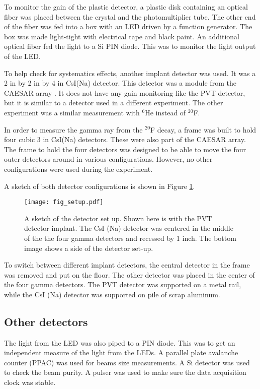 To monitor the gain of the plastic detector, a plastic disk containing an optical fiber was placed between the crystal and the photomultiplier tube. 
The other end of the fiber was fed into a box with an LED driven by a function generator. 
The box was made light-tight with electrical tape and black paint.
An additional optical fiber fed the light to a Si PIN diode.
This was to monitor the light output of the LED.

To help check for systematics effects, another implant detector was used.
It was a 2 in by 2 in by 4 in  CsI(Na) detector. 
This detector was a module from the CAESAR array \cite{Wei10}.
It does not have any gain monitoring like the PVT detector, but it is similar to a detector used in a different experiment. 
The other experiment was a similar measurement with $^{6}$He instead of $^{20}$F.

In order to measure the gamma ray from the $^{20}$F decay, a frame was built to hold four cubic 3 in CsI(Na) detectors.  
These were also part of the CAESAR array.
The frame to hold the four detectors was designed to be able to move the four outer detectors around in various configurations.
However, no other configurations were used during the experiment. 

A sketch of both detector configurations is shown in Figure \ref{fig:detsketch}.

\begin{figure}
	\texttt{[image: fig\_setup.pdf]}
	\caption{A sketch of the detector set up. 
	Shown here is with the PVT detector implant.
	The CsI (Na) detector was centered in the middle of the the four gamma detectors and recessed by 1 inch.
	The bottom image shows a side of the detector set-up.}
	\label{fig:detsketch}
\end{figure}

To switch between different implant detectors, the central detector in the frame was removed and put on the floor.
The other detector was placed in the center of the four gamma detectors.
The PVT detector was supported on a metal rail, while the CsI (Na) detector was supported on pile of scrap aluminum.

\subsection{Other detectors}

The light from the LED was also piped to a PIN diode.
This was to get an independent measure of the light from the LEDs.
A parallel plate avalanche counter (PPAC) was used for beams size measurements.
A Si detector was used to check the beam purity.
A pulser was used to make sure the data acquisition clock was stable.

